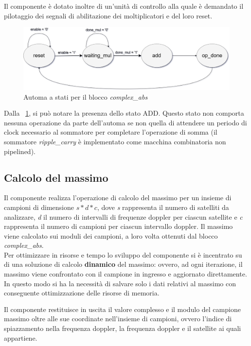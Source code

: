 \documentclass[12pt,a4paper,twoside,openany]{book}
\begin{document}
Il componente è dotato inoltre di un'unità di controllo alla quale è demandato il pilotaggio dei segnali di abilitazione dei moltiplicatori e del loro reset. 

\begin{figure}
\begin{center}
\includegraphics[width=\linewidth, keepaspectratio]{immagini/complexabs_fsm}
\caption{Automa a stati per il blocco \textit{complex\_abs}}
\label{complexabs_fsm}
\end{center}
\end{figure}

Dalla \figurename~\ref{complexabs_fsm}, si può notare la presenza dello stato ADD. Questo stato non comporta nessuna operazione da parte dell'automa se non quella di attendere un periodo di clock necessario al sommatore per completare l'operazione di somma (il sommatore \textit{ripple\_carry} è implementato come macchina combinatoria non pipelined).
\clearpage
\subsection{Calcolo del massimo}
Il componente realizza l'operazione di calcolo del massimo per un insieme di campioni di dimensione $s*d*c$, dove \textit{s} rappresenta il numero di satelliti da analizzare, \textit{d} il numero di intervalli di frequenze doppler per ciascun satellite e \textit{c} rappresenta il numero di campioni per ciascun intervallo doppler. Il massimo viene calcolato sui moduli dei campioni, a loro volta ottenuti dal blocco \textit{complex\_abs}.\\
Per ottimizzare in risorse e tempo lo sviluppo del componente si è incentrato su di una soluzione di calcolo \textbf{dinamico} del massimo: ovvero, ad ogni iterazione, il massimo viene confrontato con il campione in ingresso e aggiornato direttamente. In questo modo si ha la necessità di salvare solo i dati relativi al massimo con conseguente ottimizzazione delle risorse di memoria.

Il componente restituisce in uscita il valore complesso e il modulo del campione massimo oltre alle sue coordinate nell'insieme di campioni, ovvero l'indice di spiazzamento nella frequenza doppler, la frequenza doppler e il satellite ai quali appartiene.
\end{document}

